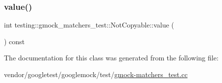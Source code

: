 \mbox{\label{classtesting_1_1gmock__matchers__test_1_1_not_copyable_af6c134767462948fa8dbd35c68370004}} 
\subsubsection{\texorpdfstring{value()}{value()}}
{\footnotesize\ttfamily int testing\+::gmock\+\_\+matchers\+\_\+test\+::\+Not\+Copyable\+::value (\begin{DoxyParamCaption}{ }\end{DoxyParamCaption}) const\hspace{0.3cm}{\ttfamily [inline]}}



The documentation for this class was generated from the following file\+:\begin{DoxyCompactItemize}
\item 
vendor/googletest/googlemock/test/\hyperlink{gmock-matchers__test_8cc}{gmock-\/matchers\+\_\+test.\+cc}\end{DoxyCompactItemize}
